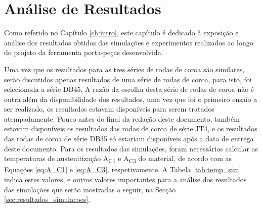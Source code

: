 \chapter{Análise de Resultados} \label{ch:resultados}
\setlength{\headheight}{13.6pt}
Como referido no Capítulo \ref{ch:intro}, este capítulo é dedicado à exposição e análise dos resultados obtidos das simulações e experimentos realizados ao longo do projeto da ferramenta porta-peças desenvolvida.
\par
Uma vez que os resultados para as tres séries de rodas de coroa são similares, serão discutidos apenas resultados de uma série de rodas de coroa, para isto, foi selecionada a série DB45. A razão da escolha desta série de rodas de coroa não é outra além da disponibilidade dos resultados, uma vez que foi o primeiro ensaio a ser realizado, os resultados estavam disponíveis para serem tratados atempadamente. Pouco antes do final da redação deste documento, também estavam disponíveis os resultados das rodas de coroa de série JT4, e os resultados das rodas de coroa de série DB35 só estariam disponíveis após a data de entrega deste documento.
Para os resultados das simulações, foram necessários calcular as temperaturas de austenitização A\textsubscript{C1} e A\textsubscript{C3} do material, de acordo com as Equações \ref{eq:A_C1} e \ref{eq:A_C3}, respetivamente. A Tabela \ref{tab:temp_sim} indica estes valores, e outros valores importantes para a análise dos resultados das simulações que serão mostradas a seguir, na Secção \ref{sec:resultados_simulacoes}.

